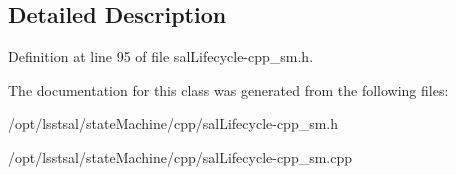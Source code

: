 \subsection{Detailed Description}


Definition at line 95 of file sal\-Lifecycle-\/cpp\-\_\-sm.\-h.



The documentation for this class was generated from the following files\-:\begin{DoxyCompactItemize}
\item 
/opt/lsstsal/state\-Machine/cpp/sal\-Lifecycle-\/cpp\-\_\-sm.\-h\item 
/opt/lsstsal/state\-Machine/cpp/sal\-Lifecycle-\/cpp\-\_\-sm.\-cpp\end{DoxyCompactItemize}
